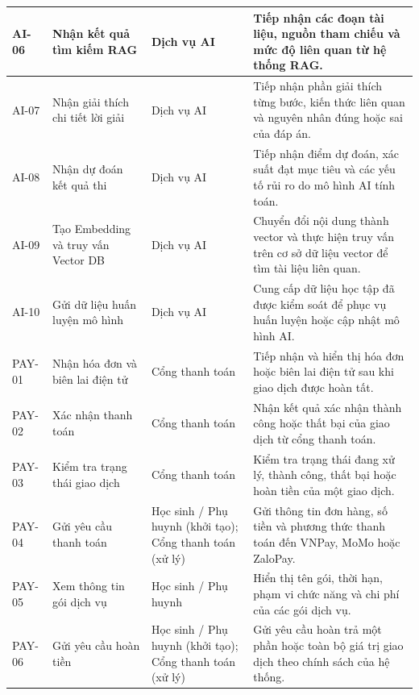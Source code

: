 \documentclass[12pt,a4paper,oneside]{report}
\begin{document}
\begin{longtable}{|p{}|p{}|p{}|p{}|}
AI-06 &
Nhận kết quả tìm kiếm RAG &
Dịch vụ AI &
Tiếp nhận các đoạn tài liệu, nguồn tham chiếu và mức độ liên quan từ hệ thống RAG. \\
\hline

AI-07 &
Nhận giải thích chi tiết lời giải &
Dịch vụ AI &
Tiếp nhận phần giải thích từng bước, kiến thức liên quan và nguyên nhân đúng hoặc sai của đáp án. \\
\hline

AI-08 &
Nhận dự đoán kết quả thi &
Dịch vụ AI &
Tiếp nhận điểm dự đoán, xác suất đạt mục tiêu và các yếu tố rủi ro do mô hình AI tính toán. \\
\hline

AI-09 &
Tạo Embedding và truy vấn Vector DB &
Dịch vụ AI &
Chuyển đổi nội dung thành vector và thực hiện truy vấn trên cơ sở dữ liệu vector để tìm tài liệu liên quan. \\
\hline

AI-10 &
Gửi dữ liệu huấn luyện mô hình &
Dịch vụ AI &
Cung cấp dữ liệu học tập đã được kiểm soát để phục vụ huấn luyện hoặc cập nhật mô hình AI. \\
\hline

PAY-01 &
Nhận hóa đơn và biên lai điện tử &
Cổng thanh toán &
Tiếp nhận và hiển thị hóa đơn hoặc biên lai điện tử sau khi giao dịch được hoàn tất. \\
\hline

PAY-02 &
Xác nhận thanh toán &
Cổng thanh toán &
Nhận kết quả xác nhận thành công hoặc thất bại của giao dịch từ cổng thanh toán. \\
\hline

PAY-03 &
Kiểm tra trạng thái giao dịch &
Cổng thanh toán &
Kiểm tra trạng thái đang xử lý, thành công, thất bại hoặc hoàn tiền của một giao dịch. \\
\hline

PAY-04 &
Gửi yêu cầu thanh toán &
Học sinh / Phụ huynh (khởi tạo); Cổng thanh toán (xử lý) &
Gửi thông tin đơn hàng, số tiền và phương thức thanh toán đến VNPay, MoMo hoặc ZaloPay. \\
\hline

PAY-05 &
Xem thông tin gói dịch vụ &
Học sinh / Phụ huynh &
Hiển thị tên gói, thời hạn, phạm vi chức năng và chi phí của các gói dịch vụ. \\
\hline

PAY-06 &
Gửi yêu cầu hoàn tiền &
Học sinh / Phụ huynh (khởi tạo); Cổng thanh toán (xử lý) &
Gửi yêu cầu hoàn trả một phần hoặc toàn bộ giá trị giao dịch theo chính sách của hệ thống. \\
\hline


\end{longtable}
\end{document}

